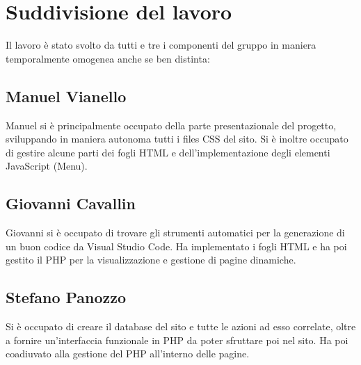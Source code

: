 \newpage
\section{Suddivisione del lavoro}
Il lavoro è stato svolto da tutti e tre i componenti del gruppo in maniera temporalmente omogenea anche se ben distinta:
\subsection{Manuel Vianello}
Manuel si è principalmente occupato della parte presentazionale del progetto, sviluppando in maniera autonoma tutti i files CSS del sito. Si è inoltre occupato di gestire alcune parti dei fogli HTML e dell'implementazione degli elementi JavaScript (Menu).
\subsection{Giovanni Cavallin}
Giovanni si è occupato di trovare gli strumenti automatici per la generazione di un buon codice da Visual Studio Code. Ha implementato i fogli HTML e ha poi gestito il PHP per la visualizzazione e gestione di pagine dinamiche.
\subsection{Stefano Panozzo}
Si è occupato di creare il database del sito e tutte le azioni ad esso correlate, oltre a fornire un'interfaccia funzionale in PHP da poter sfruttare poi nel sito. Ha poi coadiuvato alla gestione del PHP all'interno delle pagine.